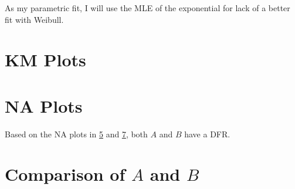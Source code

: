 As my parametric fit, I will use the \ac{MLE} of the exponential for lack of a better fit with Weibull.

\section{\ac{KM} Plots}%
\label{sec:KM_plot}

\begin{figure}[h]
    \centering
    \begin{subfigure}[b]{0.45\textwidth}
        \label{fig:KM_A}
    \end{subfigure}
    \hfill
    \begin{subfigure}[b]{0.45\textwidth}
        \label{fig:KM_B}
    \end{subfigure}
\end{figure}

\begin{figure}[h]
    \label{fig:KM_AB}
\end{figure}


\section{\ac{NA} Plots}%
\label{sec:NA_plot}

\begin{figure}[h]
    \centering
    \begin{subfigure}[b]{0.45\textwidth}
        \label{fig:NA_A}
    \end{subfigure}
    \hfill
    \begin{subfigure}[b]{0.45\textwidth}
        \label{fig:NA_B}
    \end{subfigure}
\end{figure}

Based on the \ac{NA} plots in \cref{fig:NA_A} and \cref{fig:NA_B}, both \(A\) and \(B\) have a \ac{DFR}.

\section{Comparison of \(A\) and \(B\)}%
\label{sec:comparison}

